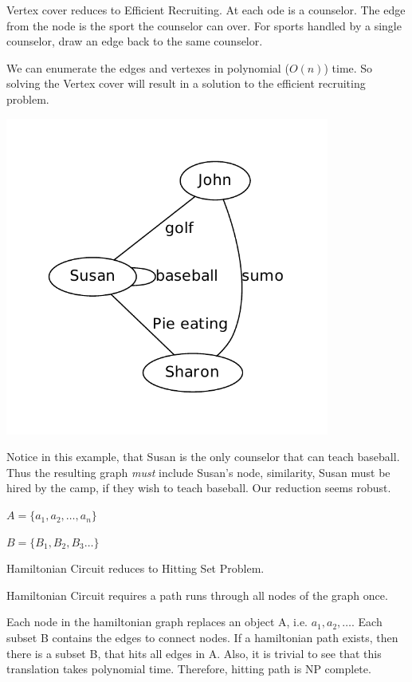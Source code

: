 \documentclass[12pt]{article}
\newenvironment{problem}[2][Problem]{\begin{trivlist}
\item[\hskip \labelsep {\bfseries #1}\hskip \labelsep {\bfseries #2.}]}{\end{trivlist}}
\begin{document}
\begin{problem}{8.3}
    Vertex cover reduces to Efficient Recruiting. At each ode is a counselor. The
    edge from the node is the sport the counselor can over. For sports handled
    by a single counselor, draw an edge back to the same counselor.
    
    We can enumerate the
    edges and vertexes in polynomial ($O(n)$) time. So solving the Vertex cover
    will result in a solution to the efficient recruiting problem.

    \includegraphics[width=0.8\textwidth]{recuruiter.pdf}

    Notice in this example, that Susan is the only counselor that can teach
    baseball. Thus the resulting graph \emph{must} include Susan's node,
    similarity, Susan must be hired by the camp, if they wish to teach baseball.
    Our reduction seems robust.
\end{problem}

\begin{problem}{8.5}

    $A = \{a_1, a_2, \dots , a_n \}$

    $B = \{B_1, B_2, B_3\dots \}$

    Hamiltonian Circuit reduces to Hitting Set Problem.

    Hamiltonian Circuit requires a path runs through all nodes of the graph once. 

    Each node in the hamiltonian graph replaces an object A, i.e. $a_1,
    a_2, \dots$.  Each subset B contains the edges to connect nodes. If
    a hamiltonian path exists, then there is a subset B, that hits all edges in
    A. Also, it is trivial to see that this translation takes polynomial time.
    Therefore, hitting path is NP complete.
\end{problem}
\end{document}
